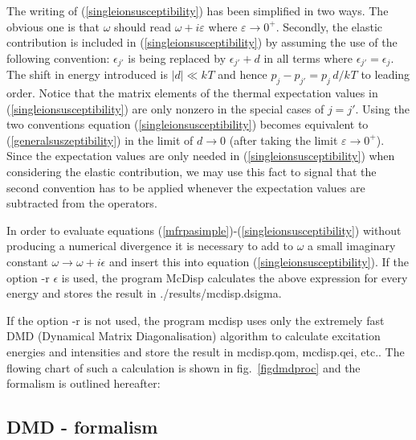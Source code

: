 The writing of (\ref{singleionsusceptibility}) has been simplified in two ways. The obvious
one is that $\omega$ should read $\omega+i \varepsilon$ where
$\varepsilon\to0^+$. Secondly, the elastic contribution is included
in (\ref{singleionsusceptibility}) by assuming the use of the following convention:
$\epsilon_{j'}$ is being replaced by $\epsilon_{j'}+d$ in all terms
where $\epsilon_{j'}=\epsilon_j$. The shift in energy introduced is
$|d|\ll k^{}T$ and hence
$p_j-p_{j'}=p_j\,d/k^{}T$ to leading order. Notice that
the matrix elements of the thermal expectation values in (\ref{singleionsusceptibility}) are
only nonzero in the special cases of $j=j'$. Using the two
conventions equation (\ref{singleionsusceptibility}) becomes 
equivalent to (\ref{generalsuszeptibility}) in the limit of
$d\to0$ (after taking the limit $\varepsilon\to0^+$).
Since the expectation values are only needed
in (\ref{singleionsusceptibility}) when considering the elastic contribution, we may use this
fact to signal that the second convention has to be applied whenever
the expectation values are subtracted from the operators.

In order to evaluate
 equations
(\ref{mfrpasimple})-(\ref{singleionsusceptibility}) without producing a numerical divergence 
it is necessary to add to $\omega$ a small imaginary constant $\omega \rightarrow \omega+i\epsilon$
and insert this into equation (\ref{singleionsusceptibility}). 
If the option {\prg -r $\epsilon$} is used,
the program {\prg McDisp} calculates the above expression for every energy
and stores the result in {\prg ./results/mcdisp.dsigma}. 

 If the option {\prg -r} is not used, the
 program {\prg mcdisp} uses only the extremely fast DMD (Dynamical Matrix Diagonalisation) %
algorithm\cite{rotter06-400} to calculate excitation energies and intensities and store the result in {\prg mcdisp.qom, %
mcdisp.qei, etc.}. The flowing chart of such a calculation is shown in fig.~\ref{figdmdproc}
and the formalism is outlined hereafter:


\subsection{DMD - formalism}\label{DMDform}

